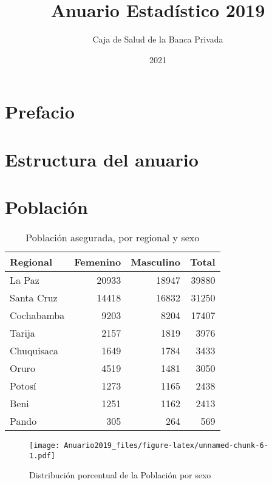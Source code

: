 \documentclass[
]{book}
\title{Anuario Estadístico 2019}
\author{Caja de Salud de la Banca Privada}
\date{2021}
\begin{document}
\maketitle

{
\setcounter{tocdepth}{1}
\tableofcontents
}
\hypertarget{prefacio}{%
\chapter*{Prefacio}\label{prefacio}}

\hypertarget{estructura-del-anuario}{%
\chapter*{Estructura del anuario}\label{estructura-del-anuario}}

\hypertarget{poblaciuxf3n}{%
\chapter{Población}\label{poblaciuxf3n}}

\begin{table}

\caption{\label{tab:unnamed-chunk-4}Población asegurada, por regional y sexo}
\centering
\begin{tabular}[t]{lrrr}
\toprule
Regional & Femenino & Masculino & Total\\
\midrule
La Paz & 20933 & 18947 & 39880\\
Santa Cruz & 14418 & 16832 & 31250\\
Cochabamba & 9203 & 8204 & 17407\\
Tarija & 2157 & 1819 & 3976\\
Chuquisaca & 1649 & 1784 & 3433\\
\addlinespace
Oruro & 4519 & 1481 & 3050\\
Potosí & 1273 & 1165 & 2438\\
Beni & 1251 & 1162 & 2413\\
Pando & 305 & 264 & 569\\
\bottomrule
\end{tabular}
\end{table}

\begin{figure}
\centering
\texttt{[image: Anuario2019\_files/figure-latex/unnamed-chunk-6-1.pdf]}
\caption{\label{fig:unnamed-chunk-6}Distribución porcentual de la Población por sexo}
\end{figure}
\end{document}
